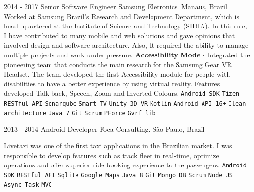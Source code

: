 \documentclass[9pt]{developercv} %
\begin{document}
\begin{entrylist}
	\entry
		{2014 -  2017}
		{Senior Software Engineer}
		{Samsung Eletronics. Manaus, Brazil}
{
Worked at Samsung Brazil’s Research and Development Department, which is head- quartered at the Institute of Science and Technology (SIDIA). In this role, I have contributed to many mobile and web solutions and gave opinions that involved design and software architecture. Also, It required the ability to manage multiple projects and work under pressure.
\newline
\newline
\textbf{Accessibility Mode } - Integrated the pioneering team that conducts the main research for the Samsung Gear VR Headset. The team developed the first  Accessibility module for people with disabilities to have a better experience by using virtual reality. Features developed Talk-back, Speech, Zoom and Inverted Colours.
 	{
 		\texttt{Android SDK}\slashsep
 		\texttt{Tizen}\slashsep
		 \texttt{RESTful API}\slashsep
		 \texttt{Sonarqube}\slashsep
		 \texttt{Smart TV}\slashsep
		 \texttt{Unity 3D-VR}\slashsep
		 \texttt{Kotlin}\slashsep
		 \texttt{Android API 16+}\slashsep
		 \texttt{Clean architecture}\slashsep
		 \texttt{Java 7}\slashsep
		 \texttt{Git}\slashsep
		 \texttt{Scrum}\slashsep
		 \texttt{PForce}\slashsep
		 \texttt{Gvrf lib}\slashsep
	}
}
\end{entrylist}
\begin{entrylist}
	\entry
		{2013 -  2014}
		{Android Developer}
		{Foca Consulting. São Paulo, Brazil}
{

Livetaxi was one of the first taxi applications in the Brazilian market. I was responsible to develop features such as track fleet in real-time, optimize operations and offer superior ride booking experience to the passengers.
\newline
 	{
 		\texttt{Android SDK}\slashsep
		 \texttt{RESTful API}\slashsep
		 \texttt{Sqlite}\slashsep
		 \texttt{Google Maps}\slashsep
		 \texttt{Java 8}\slashsep
		 \texttt{Git}\slashsep
		 \texttt{Mongo DB}\slashsep
		 \texttt{Scrum}\slashsep
		 \texttt{Node JS}\slashsep
		 \texttt{Async Task}\slashsep
		 \texttt{MVC}\slashsep
	}
}
\end{entrylist}
\end{document}
